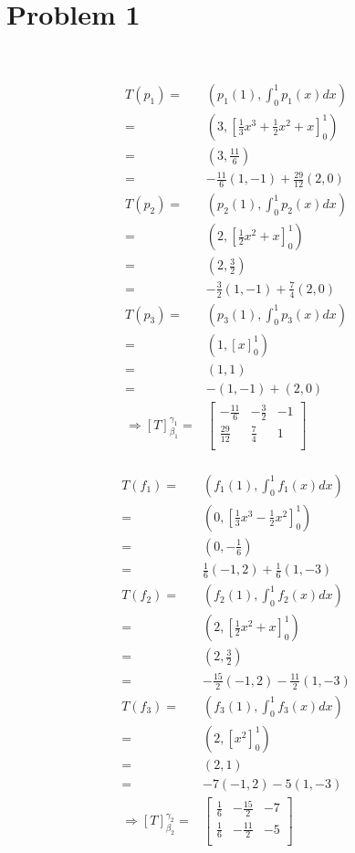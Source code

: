 \documentclass{article}
\begin{document}
\section{Problem 1}

~

\begin{equation*}
\begin{split}
T(p_1)=&(p_1(1),\int^1_0p_1(x)dx)\\
=&(3,\left[\frac{1}{3}x^3+\frac{1}{2}x^2+x\right]^1_0)\\
=&(3,\frac{11}{6})\\
=&-\frac{11}{6}(1,-1)+\frac{29}{12}(2,0)\\
T(p_2)=&(p_2(1),\int^1_0p_2(x)dx)\\
=&(2,\left[\frac{1}{2}x^2+x\right]^1_0)\\
=&(2,\frac{3}{2})\\
=&-\frac{3}{2}(1,-1)+\frac{7}{4}(2,0)\\
T(p_3)=&(p_3(1),\int^1_0p_3(x)dx)\\
=&(1,\left[x\right]^1_0)\\
=&(1,1)\\
=&-(1,-1)+(2,0)\\
\Rightarrow \left[T\right]^{\gamma_1}_{\beta_1}=&\begin{bmatrix}
-\frac{11}{6}&-\frac{3}{2}&-1\\
\frac{29}{12}&\frac{7}{4}&1\\
\end{bmatrix}\\
\end{split}
\end{equation*}

\begin{equation*}
\begin{split}
T(f_1)=&(f_1(1),\int^1_0f_1(x)dx)\\
=&(0,\left[\frac{1}{3}x^3-\frac{1}{2}x^2\right]^1_0)\\
=&(0,-\frac{1}{6})\\
=&\frac{1}{6}(-1,2)+\frac{1}{6}(1,-3)\\
T(f_2)=&(f_2(1),\int^1_0f_2(x)dx)\\
=&(2,\left[\frac{1}{2}x^2+x\right]^1_0)\\
=&(2,\frac{3}{2})\\
=&-\frac{15}{2}(-1,2)-\frac{11}{2}(1,-3)\\
T(f_3)=&(f_3(1),\int^1_0f_3(x)dx)\\
=&(2,\left[x^2\right]^1_0)\\
=&(2,1)\\
=&-7(-1,2)-5(1,-3)\\
\Rightarrow \left[T\right]^{\gamma_2}_{\beta_2}=&\begin{bmatrix}
\frac{1}{6}&-\frac{15}{2}&-7\\
\frac{1}{6}&-\frac{11}{2}&-5\\
\end{bmatrix}\\
\end{split}
\end{equation*}
\end{document}
